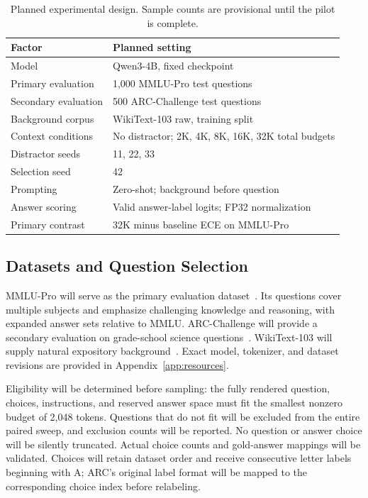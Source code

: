 \documentclass[conference]{IEEEtran}
\begin{document}
\begin{table}[t]
\caption{Planned experimental design. Sample counts are provisional until the pilot is complete.}
\label{tab:design}
\centering\small
\begin{tabularx}{\columnwidth}{@{}p{}Y@{}}
\toprule
Factor & Planned setting \\
\midrule
Model & Qwen3-4B, fixed checkpoint \\
Primary evaluation & 1,000 MMLU-Pro test questions \\
Secondary evaluation & 500 ARC-Challenge test questions \\
Background corpus & WikiText-103 raw, training split \\
Context conditions & No distractor; 2K, 4K, 8K, 16K, 32K total budgets \\
Distractor seeds & 11, 22, 33 \\
Selection seed & 42 \\
Prompting & Zero-shot; background before question \\
Answer scoring & Valid answer-label logits; FP32 normalization \\
Primary contrast & 32K minus baseline ECE on MMLU-Pro \\
\bottomrule
\end{tabularx}
\end{table}

\subsection{Datasets and Question Selection}
MMLU-Pro will serve as the primary evaluation dataset~\cite{wang2024}. Its questions cover multiple subjects and emphasize challenging knowledge and reasoning, with expanded answer sets relative to MMLU. ARC-Challenge will provide a secondary evaluation on grade-school science questions~\cite{clark2018}. WikiText-103 will supply natural expository background~\cite{merity2016}. Exact model, tokenizer, and dataset revisions are provided in Appendix~\ref{app:resources}.

Eligibility will be determined before sampling: the fully rendered question, choices, instructions, and reserved answer space must fit the smallest nonzero budget of 2,048 tokens. Questions that do not fit will be excluded from the entire paired sweep, and exclusion counts will be reported. No question or answer choice will be silently truncated. Actual choice counts and gold-answer mappings will be validated. Choices will retain dataset order and receive consecutive letter labels beginning with A; ARC's original label format will be mapped to the corresponding choice index before relabeling.
\end{document}
